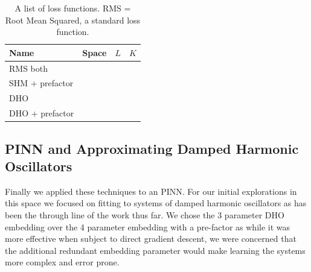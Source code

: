 \begin{table}
\label{table:optimisation-results}
\caption{A list of loss functions. RMS = Root Mean Squared, a standard loss function.}
\begin{tabular}{l|c|c|c}
  Name & Space & $L$ & $K$ \\
  \hline
  RMS both \\
  SHM + prefactor  \\
  DHO \\
  DHO + prefactor \\
\end{tabular}
\end{table}


\subsection{PINN and Approximating Damped Harmonic Oscillators}



Finally we applied these techniques to an PINN. For our initial explorations in this space we focused on fitting to systems of damped harmonic oscillators as has been the through line of the work thus far. We chose the 3 parameter DHO embedding over the 4 parameter embedding with a pre-factor as while it was more effective when subject to direct gradient descent, we were concerned that the additional redundant embedding parameter would make learning the systems more complex and error prone. 

